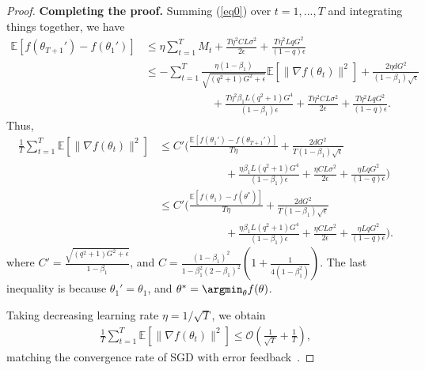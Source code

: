 \documentclass[11pt]{article}
\begin{document}
\begin{proof}
\textbf{Completing the proof.} Summing (\ref{eq0}) over $t=1,...,T$ and integrating things together, we have
\begin{align*}
    \mathbb E[f(\theta_{T+1}')-f(\theta_1')]&\leq \eta \sum_{t=1}^T M_t+\frac{T\eta^2CL\sigma^2}{2\epsilon}+\frac{T\eta^2 LqG^2}{(1-q)\epsilon}\\
    &\leq -\sum_{t=1}^T \frac{\eta(1-\beta_1)}{\sqrt{(q^2+1)G^2+\epsilon}}\mathbb E[\|\nabla f(\theta_t)\|^2]+\frac{2\eta dG^2}{(1-\beta_1)\sqrt\epsilon}\\
    &\hspace{1in}+ \frac{T \eta^2\beta_1 L(q^2+1)G^4}{(1-\beta_1)\epsilon} +\frac{T\eta^2CL\sigma^2}{2\epsilon}+\frac{T\eta^2 LqG^2}{(1-q)\epsilon}.
\end{align*}
Thus,
\begin{align*}
    \frac{1}{T}\sum_{t=1}^T \mathbb E[\|\nabla f(\theta_t)\|^2]&\leq C'\Big(\frac{\mathbb E[f(\theta_1')-f(\theta_{T+1}')]}{T\eta}+\frac{2dG^2}{T(1-\beta_1)\sqrt\epsilon}\\
    &\hspace{1in} + \frac{\eta\beta_1 L(q^2+1)G^4}{(1-\beta_1)\epsilon} +\frac{\eta CL\sigma^2}{2\epsilon}+\frac{\eta LqG^2}{(1-q)\epsilon} \Big)\\
    &\leq C'\Big(\frac{\mathbb E[f(\theta_1)-f(\theta^*)]}{T\eta}+\frac{2dG^2}{T(1-\beta_1)\sqrt\epsilon}\\
    &\hspace{1in} + \frac{\eta\beta_1 L(q^2+1)G^4}{(1-\beta_1)\epsilon} +\frac{\eta CL\sigma^2}{2\epsilon}+\frac{\eta LqG^2}{(1-q)\epsilon} \Big).
\end{align*}
where $C'=\frac{\sqrt{(q^2+1)G^2+\epsilon}}{1-\beta_1}$, and $C=\frac{(1-\beta_1)^2}{1-\beta_1^2(2-\beta_1)^2}(1+\frac{1}{4(1-\beta_1^2)})$. The last inequality is because $\theta_1'=\theta_1$, and $\theta^*=\argmin_\theta f(\theta)$.

Taking decreasing learning rate $\eta=1/\sqrt T$, we obtain
\begin{align*}
    \frac{1}{T}\sum_{t=1}^T \mathbb E[\|\nabla f(\theta_t)\|^2]\leq \mathcal O(\frac{1}{\sqrt T}+\frac{1}{T}),
\end{align*}
matching the convergence rate of SGD with error feedback~\cite{karimireddy2019error}.

\end{proof}
\end{document}
